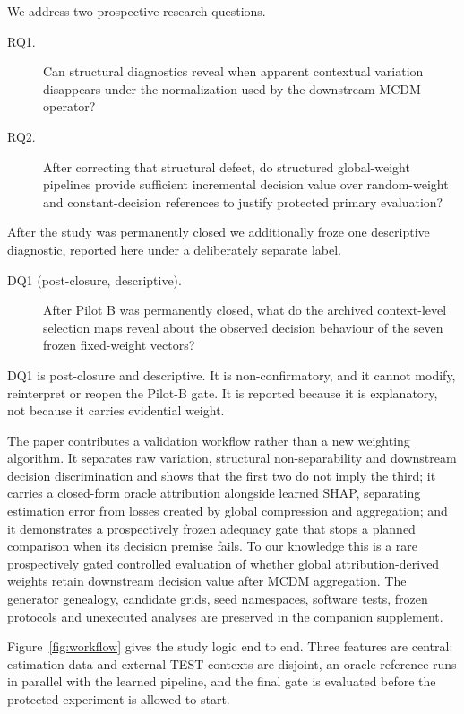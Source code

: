 \documentclass[runningheads,orivec]{llncs}
\begin{document}
We address two prospective research questions.

\begin{description}
\item[RQ1.] Can structural diagnostics reveal when apparent contextual variation
disappears under the normalization used by the downstream MCDM operator?
\item[RQ2.] After correcting that structural defect, do structured global-weight
pipelines provide sufficient incremental decision value over random-weight and
constant-decision references to justify protected primary evaluation?
\end{description}

After the study was permanently closed we additionally froze one descriptive
diagnostic, reported here under a deliberately separate label.

\begin{description}
\item[DQ1 (post-closure, descriptive).] After Pilot B was permanently closed, what do
the archived context-level selection maps reveal about the observed decision behaviour
of the seven frozen fixed-weight vectors?
\end{description}

DQ1 is post-closure and descriptive. It is non-confirmatory, and it cannot modify,
reinterpret or reopen the Pilot-B gate. It is reported because it is explanatory, not
because it carries evidential weight.

The paper contributes a validation workflow rather than a new weighting algorithm. It
separates raw variation, structural non-separability and downstream decision
discrimination and shows that the first two do not imply the third; it carries a
closed-form oracle attribution alongside learned SHAP, separating estimation error
from losses created by global compression and aggregation; and it demonstrates a
prospectively frozen adequacy gate that stops a planned comparison when its decision
premise fails. To our knowledge this is a rare prospectively gated controlled
evaluation of whether global attribution-derived weights retain downstream decision
value after MCDM aggregation. The generator genealogy, candidate grids, seed
namespaces, software tests, frozen protocols and unexecuted analyses are preserved in
the companion supplement.

Figure~\ref{fig:workflow} gives the study logic end to end. Three features are
central: estimation data and external TEST contexts are disjoint, an oracle reference
runs in parallel with the learned pipeline, and the final gate is evaluated before the
protected experiment is allowed to start.
\end{document}
